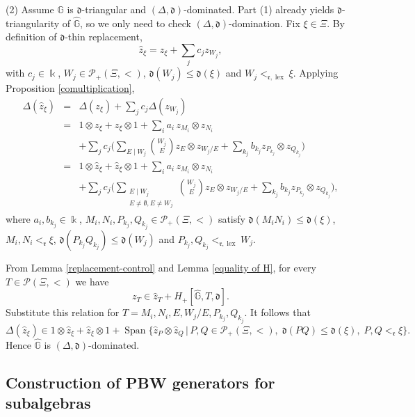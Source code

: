 \documentclass{article}
\makeatletter
\renewenvironment{proof}[1][\proofname]{\par
	\pushQED{\qed}%
	\normalfont \topsep6\p@\@plus6\p@\relax
	\trivlist
	\item[\hskip\labelsep
	\bfseries
	#1\@addpunct{.}]\ignorespaces
}{%
	\popQED\endtrivlist\@endpefalse
}
\theoremstyle{plain}
\theoremstyle{definition}
\numberwithin{equation}{section}
\DeclareMathOperator{\Span}{Span}
\DeclareMathOperator{\lex}{lex}
\newcommand{\GG}{\mathbb{G}}
\newcommand{\dd}{\mathfrak{d}}
\newcommand{\rr}{\mathfrak{r}}
\makeatother
\begin{document}
\begin{proof}
		(2) Assume $\GG$ is $\dd$-triangular and $(\Delta,\dd)$-dominated. Part (1) already yields $\dd$-triangularity of $\hat{\GG}$, so we only need to check $(\Delta,\dd)$-domination. Fix $\xi\in \Xi$. By definition of $\dd$-thin replacement,
		\[
		\hat{z}_{\xi} =z_{\xi} + \sum_{j}c_{j} z_{W_{j}},
		\]
		with $c_{j}\in \Bbbk$, $W_{j} \in \mathcal{P}_{+}(\Xi, <)$, $\dd(W_{j}) \leq \dd(\xi)$ and $W_{j} <_{\rr,\lex} \xi$. Applying Proposition \ref{comultiplication},
		\begin{eqnarray*}
			\Delta(\hat{z}_{\xi}) & = & \Delta(z_{\xi}) + \sum_{j}c_{j} \Delta(z_{W_{j}}) \\
			& = & 1\otimes z_\xi + z_\xi\otimes 1 + \sum_{i}a_{i}\,z_{M_{i}}\otimes z_{N_{i}} \\
			&& + \sum_{j} c_{j} \Big( \sum_{E\mid W_{j}}  \binom{W_{j}}{E} z_{E} \otimes z_{W_{j}/E} + \sum_{k_{j}} b_{k_{j}} z_{P_{k_{j}}} \otimes z_{Q_{k_{j}}} \Big) \\
			& =& 1\otimes \hat{z}_\xi + \hat{z}_\xi\otimes 1 +  \sum_{i}a_{i}\,z_{M_{i}}\otimes z_{N_{i}} \\
			&& + \sum_{j} c_{j}  \Big(  \sum_{\substack{E\mid W_{j} \\ E\neq \emptyset, E\neq W_{j}}} \binom{W_{j}}{E} z_{E} \otimes z_{W_{j}/E} + \sum_{k_{j}} b_{k_{j}} z_{P_{k_{j}}} \otimes z_{Q_{k_{j}}} \Big),
		\end{eqnarray*}
		where $a_{i}, b_{k_{j}} \in \Bbbk$, $M_{i},N_{i}, P_{k_{j}}, Q_{k_{j}}\in\mathcal{P}_{+}(\Xi,<)$ satisfy
		$\dd(M_{i} N_{i}) \leq \dd(\xi)$, $M_{i}, N_{i}<_{\rr}\xi$,
		$\dd(P_{k_{j}}Q_{k_{j}}) \leq \dd(W_{j})$ and $P_{k_{j}}, Q_{k_{j}} <_{\rr,\lex} W_{j}$.
		
		From Lemma \ref{replacement-control} and Lemma \ref{equality of H}, for every $T\in \mathcal{P}(\Xi, <)$ we have
		\[
		z_{T} \in \hat{z}_{T} + H_{+}[\hat{\GG}, T, \dd].
		\]
		Substitute this relation for $T= M_{i}, N_{i}, E, W_{j}/E, P_{k_{j}}, Q_{k_{j}}$. It follows that
		\[
		\Delta(\hat{z}_{\xi}) \in 1\otimes \hat{z}_\xi + \hat{z}_\xi\otimes 1 + \Span \big \{\hat{z}_{P}\otimes \hat{z}_{Q} \,\big|\, P,Q\in \mathcal{P}_{+}(\Xi, <),\; \dd(PQ) \leq \dd(\xi),\; P, Q <_{\rr} \xi \big\}.
		\]
		Hence $\hat{\GG}$ is $(\Delta,\dd)$-dominated.
	\end{proof}
	
	\subsection{Construction of PBW generators for subalgebras}
	
\end{document}
